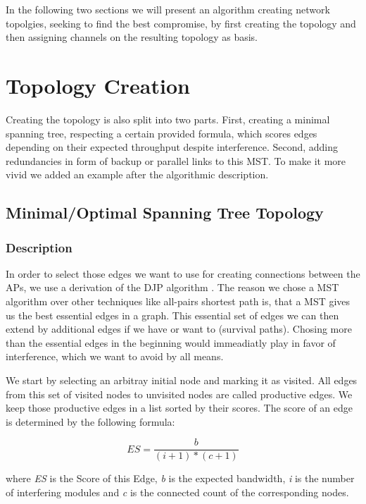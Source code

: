   In the following two sections we will present an algorithm creating network topolgies, seeking to find the best compromise, by first creating the topology and then
  assigning channels on the resulting topology as basis.
  
 \newpage 
 
  \section{Topology Creation}
    Creating the topology is also split into two parts.
    First, creating a minimal spanning tree, respecting a certain provided formula, which scores edges depending on their expected throughput despite interference.
    Second, adding redundancies in form of backup or parallel links to this \ac{MST}. To make it more vivid we added an example after the algorithmic description.

    \subsection{Minimal/Optimal Spanning Tree Topology}
      \subsubsection{Description}
	In order to select those edges we want to use for creating connections between the APs, we use a derivation of the \ac{DJP} algorithm \cite{prim}\cite{jarnik}.
	The reason we chose a \ac{MST} algorithm over other techniques like all-pairs shortest path is, that a MST gives us the best essential edges in a graph. 
	This essential set of edges we can then extend by additional edges if we have or want to (survival paths). 
	Chosing more than the essential edges in the beginning would immeadiatly play in favor of interference, which we want to avoid by all means.      
	
	We start by selecting an arbitray initial node and marking it as visited. All edges from this set of visited nodes to unvisited nodes are called productive edges.
	We keep those productive edges in a list sorted by their scores. The score of an edge is determined by the following formula:
	
	\begin{equation} \label{eq:edgescore}
	  ES=\frac{b}{(i + 1 )* (c + 1)}
	\end{equation}
	
	where \textit{ES} is the Score of this Edge, \textit{b} is the expected bandwidth, \textit{i} is the number of 
	interfering modules and \textit{c} is the connected count of the corresponding nodes.
	
